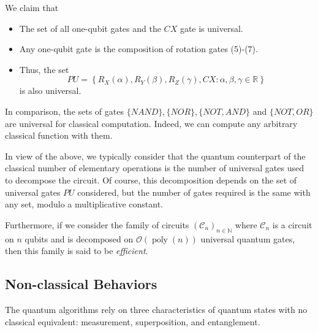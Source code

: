 \begin{theorem}
We claim that
\begin{itemize}
    \item The set of all one-qubit gates and the $C X$ gate is universal.
    \item Any one-qubit gate is the composition of rotation gates (5)-(7).
    \item Thus, the set 
\begin{equation}
    P U=\left\{R_{X}(\alpha), R_{Y}(\beta), R_{Z}(\gamma), C X: \alpha, \beta, \gamma \in \mathbb{R}\right\}
\end{equation}
is also universal.
\end{itemize}
\end{theorem}

In comparison, the sets of gates $\{N A N D\},\{N O R\},\{N O T, A N D\}$ and $\{N O T, O R\}$ are universal for classical computation.  Indeed, we can compute any arbitrary classical function with them. %

In view of the above, we typically consider that the quantum counterpart of the classical number of elementary operations is the number of universal gates used to decompose the circuit. Of course, this decomposition depends on the set of universal gates $P U$ considered, but the number of gates required is the same with any set, modulo a multiplicative constant. 


Furthermore, if we consider the family of circuits $\left(\mathcal{C}_{n}\right)_{n \in \mathbb{N}}$ where $\mathcal{C}_{n}$ is a circuit on $n$ qubits and is decomposed on $\mathcal{O}(\operatorname{poly}(n))$ universal quantum gates, then this family is said to be \textit{efficient}.

\subsection{Non-classical Behaviors} %

The quantum algorithms rely on three characteristics of quantum states with no classical equivalent: measurement, superposition, and entanglement.

